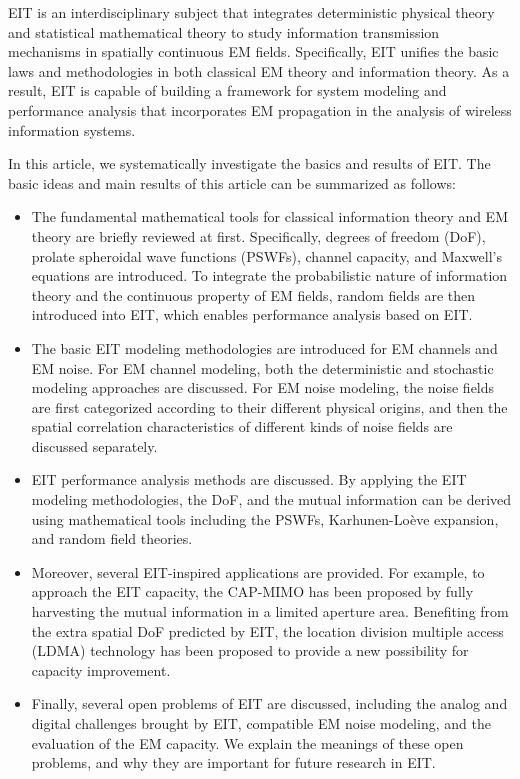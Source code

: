 \documentclass[journal,twocolumn]{IEEEtran}
\begin{document}
EIT is an interdisciplinary subject that integrates deterministic physical theory and statistical mathematical theory to study information transmission mechanisms in spatially continuous EM fields. 
Specifically, EIT unifies the basic laws and methodologies in both classical EM theory and information theory. 
As a result, EIT is capable of building a framework for system modeling and performance analysis that incorporates EM propagation in the analysis of wireless information systems. 

In this article, we systematically investigate the basics and results of EIT. The basic ideas and main results of this article can be summarized as follows:
\begin{itemize}
\item{The fundamental mathematical tools for classical information theory and EM theory are briefly reviewed at first. Specifically, degrees of freedom (DoF), prolate spheroidal wave functions (PSWFs), channel capacity, and Maxwell's equations are introduced. To integrate the probabilistic nature of information theory and the continuous property of EM fields, random fields are then introduced into EIT, which enables performance analysis based on EIT. }
\item{The basic EIT modeling methodologies are introduced for EM channels and EM noise. For EM channel modeling, both the deterministic and stochastic modeling approaches are discussed. For EM noise modeling, the noise fields are first categorized according to their different physical origins, and then the spatial correlation characteristics of different kinds of noise fields are discussed separately. }
\item{EIT performance analysis methods are discussed. By applying the EIT modeling methodologies, the DoF, and the mutual information can be derived using mathematical tools including the PSWFs, Karhunen-Lo\`{e}ve expansion, and random field theories. } 
\item Moreover, several EIT-inspired applications are provided. For example, to approach the EIT capacity, the CAP-MIMO has been proposed by fully harvesting the mutual information in a limited aperture area. Benefiting from the extra spatial DoF predicted by EIT, the location division multiple access (LDMA) technology has been proposed to provide a new possibility for capacity improvement. %
\item{Finally, several open problems of EIT are discussed, including the analog and digital challenges brought by EIT, compatible EM noise modeling, and the evaluation of the EM capacity. We explain the meanings of these open problems, and why they are important for future research in EIT. }
\end{itemize}
\end{document}
